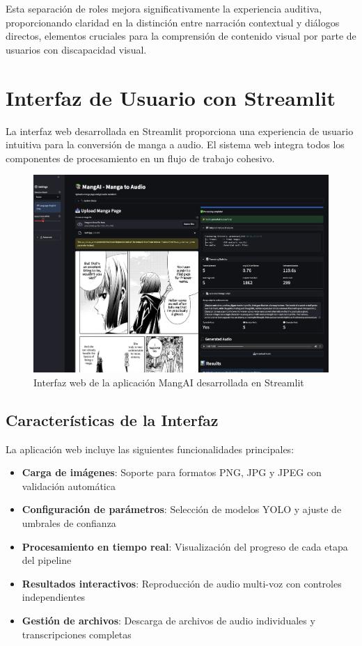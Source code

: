 \documentclass[conference]{IEEEtran}
\begin{document}
Esta separación de roles mejora significativamente la experiencia auditiva, proporcionando claridad en la distinción entre narración contextual y diálogos directos, elementos cruciales para la comprensión de contenido visual por parte de usuarios con discapacidad visual.

\section{Interfaz de Usuario con Streamlit}
La interfaz web desarrollada en Streamlit proporciona una experiencia de usuario intuitiva para la conversión de manga a audio. El sistema web integra todos los componentes de procesamiento en un flujo de trabajo cohesivo.

\begin{figure}[ht]
\centering
\includegraphics[width=\columnwidth]{resources/app.png}
\caption{Interfaz web de la aplicación MangAI desarrollada en Streamlit}
\label{fig:streamlit-interface}
\end{figure}

\subsection{Características de la Interfaz}
La aplicación web incluye las siguientes funcionalidades principales:
\begin{itemize}
\item \textbf{Carga de imágenes}: Soporte para formatos PNG, JPG y JPEG con validación automática
\item \textbf{Configuración de parámetros}: Selección de modelos YOLO y ajuste de umbrales de confianza
\item \textbf{Procesamiento en tiempo real}: Visualización del progreso de cada etapa del pipeline
\item \textbf{Resultados interactivos}: Reproducción de audio multi-voz con controles independientes
\item \textbf{Gestión de archivos}: Descarga de archivos de audio individuales y transcripciones completas
\end{itemize}
\end{document}
